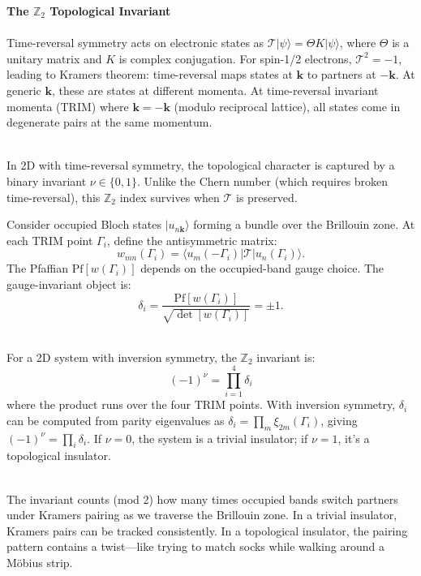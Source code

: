 \begin{technical}
{\Large\textbf{The $\mathbb{Z}_2$ Topological Invariant}}\\[0.3em]

\\[0.5em]
Time-reversal symmetry acts on electronic states as $\mathcal{T}|\psi\rangle = \Theta K|\psi\rangle$, where $\Theta$ is a unitary matrix and $K$ is complex conjugation. For spin-1/2 electrons, $\mathcal{T}^2 = -1$, leading to Kramers theorem: time-reversal maps states at $\mathbf{k}$ to partners at $-\mathbf{k}$. At generic $\mathbf{k}$, these are states at different momenta. At time-reversal invariant momenta (TRIM) where $\mathbf{k} = -\mathbf{k}$ (modulo reciprocal lattice), all states come in degenerate pairs at the same momentum.

\\[0.5em]
In 2D with time-reversal symmetry, the topological character is captured by a binary invariant $\nu \in \{0,1\}$. Unlike the Chern number (which requires broken time-reversal), this $\mathbb{Z}_2$ index survives when $\mathcal{T}$ is preserved.

Consider occupied Bloch states $|u_{n\mathbf{k}}\rangle$ forming a bundle over the Brillouin zone. At each TRIM point $\Gamma_i$, define the antisymmetric matrix:
\[
w_{mn}(\Gamma_i) = \langle u_m(-\Gamma_i)|\mathcal{T}|u_n(\Gamma_i)\rangle.
\]
The Pfaffian $\text{Pf}[w(\Gamma_i)]$ depends on the occupied-band gauge choice. The gauge-invariant object is:
\[
\delta_i = \frac{\text{Pf}[w(\Gamma_i)]}{\sqrt{\det[w(\Gamma_i)]}} = \pm 1.
\]

\\[0.5em]
For a 2D system with inversion symmetry, the $\mathbb{Z}_2$ invariant is:
\[
(-1)^\nu = \prod_{i=1}^4 \delta_i
\]
where the product runs over the four TRIM points. With inversion symmetry, $\delta_i$ can be computed from parity eigenvalues as $\delta_i = \prod_m \xi_{2m}(\Gamma_i)$, giving $(-1)^\nu = \prod_i \delta_i$. If $\nu = 0$, the system is a trivial insulator; if $\nu = 1$, it's a topological insulator.

\columnbreak

\\[0.5em]
The invariant counts (mod 2) how many times occupied bands switch partners under Kramers pairing as we traverse the Brillouin zone. In a trivial insulator, Kramers pairs can be tracked consistently. In a topological insulator, the pairing pattern contains a twist—like trying to match socks while walking around a Möbius strip.


\end{technical}

